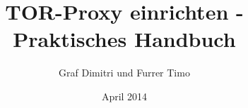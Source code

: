 \documentclass[12pt,titlepage]{article}
\begin{document}
\title{TOR-Proxy einrichten - Praktisches Handbuch}
\author{Graf Dimitri und Furrer Timo}
\date{April 2014}
\maketitle

\tableofcontents
\newpage



\listoffigures
\end{document}
